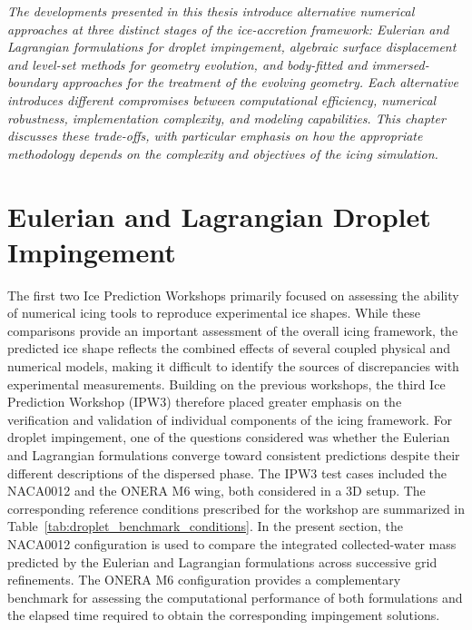 \label{sec:discussions}

\textit{
    The developments presented in this thesis introduce alternative numerical approaches at three distinct stages of the ice-accretion framework: Eulerian and Lagrangian formulations for droplet impingement, algebraic surface displacement and level-set methods for geometry evolution, and body-fitted and immersed-boundary approaches for the treatment of the evolving geometry. Each alternative introduces different compromises between computational efficiency, numerical robustness, implementation complexity, and modeling capabilities. This chapter discusses these trade-offs, with particular emphasis on how the appropriate methodology depends on the complexity and objectives of the icing simulation.
    }

\section{Eulerian and Lagrangian Droplet Impingement}\label{sec:lagEulDiscussions}

The first two Ice Prediction Workshops primarily focused on assessing the ability of numerical icing tools to reproduce experimental ice shapes. While these comparisons provide an important assessment of the overall icing framework, the predicted ice shape reflects the combined effects of several coupled physical and numerical models, making it difficult to identify the sources of discrepancies with experimental measurements. Building on the previous workshops, the third Ice Prediction Workshop (IPW3) therefore placed greater emphasis on the verification and validation of individual components of the icing framework. For droplet impingement, one of the questions considered was whether the Eulerian and Lagrangian formulations converge toward consistent predictions despite their different descriptions of the dispersed phase. The IPW3 test cases included the NACA0012 and the ONERA M6 wing, both considered in a 3D setup. The corresponding reference conditions prescribed for the workshop are summarized in Table~\ref{tab:droplet_benchmark_conditions}. In the present section, the NACA0012 configuration is used to compare the integrated collected-water mass predicted by the Eulerian and Lagrangian formulations across successive grid refinements. The ONERA M6 configuration provides a complementary benchmark for assessing the computational performance of both formulations and the elapsed time required to obtain the corresponding impingement solutions.

